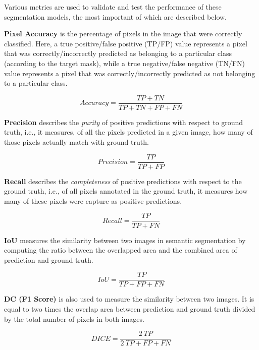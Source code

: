 Various metrics are used to validate and test the performance of these segmentation models, the most important of which are described below.

\textbf{Pixel Accuracy} is the percentage of pixels in the image that were correctly classified. Here, a true positive/false positive (TP/FP) value represents a pixel that was correctly/incorrectly predicted as belonging to a particular class (according to the target mask), while a true negative/false negative (TN/FN) value represents a pixel that was correctly/incorrectly predicted as not belonging to a particular class.

\begin{equation}
    Accuracy = \frac{TP+TN}{TP+TN+FP+FN}
\end{equation}

\textbf{Precision} describes the \textit{purity} of positive predictions with respect to ground truth, i.e., it measures, of all the pixels predicted in a given image, how many of those pixels actually match with ground truth.

\begin{equation}
    Precision = \frac{TP}{TP+FP}
\end{equation}

\textbf{Recall} describes the \textit{completeness} of positive predictions with respect to the ground truth, i.e., of all pixels annotated in the ground truth, it measures how many of these pixels were capture as positive predictions.

\begin{equation}
    Recall = \frac{TP}{TP+FN}
\end{equation}

\textbf{\ac{IoU}} measures the similarity between two images in semantic segmentation by computing the ratio between the overlapped area and the combined area of prediction and ground truth.

\begin{equation}
    IoU = \frac{TP}{TP+FP+FN}
\end{equation}

\textbf{\ac{DC} (F1 Score)} is also used to measure the similarity between two images. It is equal to two times the overlap area between prediction and ground truth divided by the total number of pixels in both images.

\begin{equation}
    DICE = \frac{2 \ TP}{2 \ TP+FP+FN}
\end{equation}

